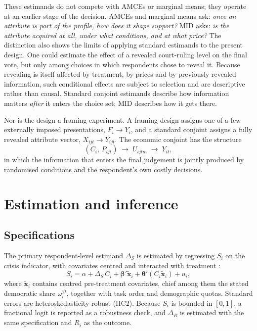 \documentclass[11pt]{article}
\newcommand{\Dem}{\mathcal{D}}
\begin{document}
These estimands do not compete with AMCEs or marginal means; they operate at an earlier stage of the decision. AMCEs and marginal means ask: \emph{once an attribute is part of the profile, how does it shape support?} MID asks: \emph{is the attribute acquired at all, under what conditions, and at what price?} The distinction also shows the limits of applying standard estimands to the present design. One could estimate the effect of a revealed court-ruling level on the final vote, but only among choices in which respondents chose to reveal it. Because revealing is itself affected by treatment, by prices and by previously revealed information, such conditional effects are subject to selection and are descriptive rather than causal. Standard conjoint estimands describe how information matters \emph{after} it enters the choice set; MID describes how it gets there.

Nor is the design a framing experiment. A framing design assigns one of a few externally imposed presentations, $F_i\rightarrow Y_i$, and a standard conjoint assigns a fully revealed attribute vector, $X_{ijt}\rightarrow Y_{ijt}$. The economic conjoint has the structure
\[
(C_i,\,P_{ijt})\;\longrightarrow\;U_{ijtm}\;\longrightarrow\;Y_{it},
\]
in which the information that enters the final judgement is jointly produced by randomised conditions and the respondent's own costly decisions.

\section{Estimation and inference}

\subsection{Specifications}

The primary respondent-level estimand $\Delta_S$ is estimated by regressing $S_i$ on the crisis indicator, with covariates centred and interacted with treatment \parencite{Lin2013}:
\[
S_i=\alpha+\Delta_S\,C_i+\boldsymbol{\beta}'\tilde{\mathbf{x}}_i+\boldsymbol{\theta}'(C_i\tilde{\mathbf{x}}_i)+u_i,
\]
where $\tilde{\mathbf{x}}_i$ contains centred pre-treatment covariates, chief among them the stated democratic share $\omega_i^{\Dem}$, together with task order and demographic quotas. Standard errors are heteroskedasticity-robust (HC2). Because $S_i$ is bounded in $[0,1]$, a fractional logit \parencite{PapkeWooldridge1996} is reported as a robustness check, and $\Delta_R$ is estimated with the same specification and $R_i$ as the outcome.
\end{document}
